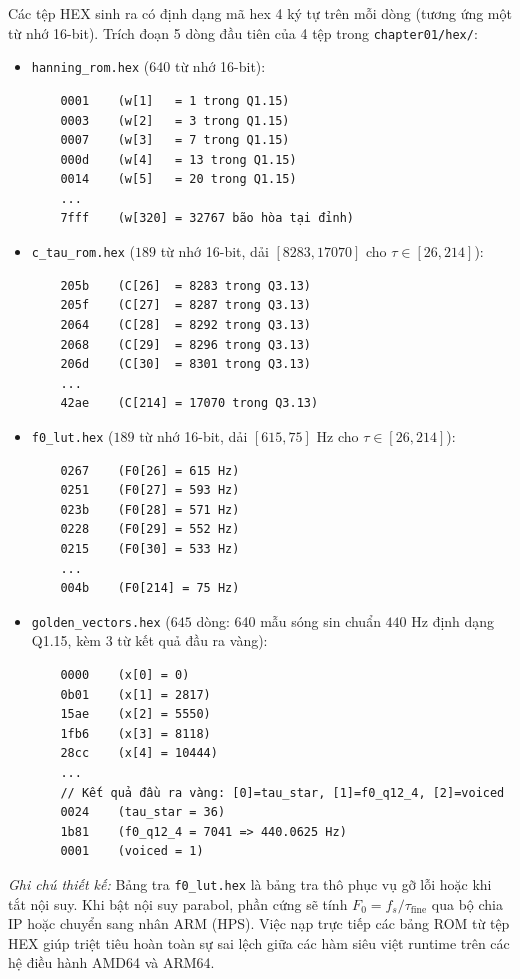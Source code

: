\documentclass[11pt,a4paper]{article}
\begin{document}
Các tệp HEX sinh ra có định dạng mã hex 4 ký tự trên mỗi dòng (tương ứng một từ nhớ 16-bit). Trích đoạn 5 dòng đầu tiên của 4 tệp trong \texttt{chapter01/hex/}:
\begin{itemize}
    \setlength{\itemsep}{1pt}
    \item \texttt{hanning\_rom.hex} ($640$ từ nhớ 16-bit):
    \begin{verbatim}
    0001    (w[1]   = 1 trong Q1.15)
    0003    (w[2]   = 3 trong Q1.15)
    0007    (w[3]   = 7 trong Q1.15)
    000d    (w[4]   = 13 trong Q1.15)
    0014    (w[5]   = 20 trong Q1.15)
    ...
    7fff    (w[320] = 32767 bão hòa tại đỉnh)
    \end{verbatim}
    \item \texttt{c\_tau\_rom.hex} ($189$ từ nhớ 16-bit, dải $[8283, 17070]$ cho $\tau \in [26, 214]$):
    \begin{verbatim}
    205b    (C[26]  = 8283 trong Q3.13)
    205f    (C[27]  = 8287 trong Q3.13)
    2064    (C[28]  = 8292 trong Q3.13)
    2068    (C[29]  = 8296 trong Q3.13)
    206d    (C[30]  = 8301 trong Q3.13)
    ...
    42ae    (C[214] = 17070 trong Q3.13)
    \end{verbatim}
    \item \texttt{f0\_lut.hex} ($189$ từ nhớ 16-bit, dải $[615, 75]\text{ Hz}$ cho $\tau \in [26, 214]$):
    \begin{verbatim}
    0267    (F0[26] = 615 Hz)
    0251    (F0[27] = 593 Hz)
    023b    (F0[28] = 571 Hz)
    0228    (F0[29] = 552 Hz)
    0215    (F0[30] = 533 Hz)
    ...
    004b    (F0[214] = 75 Hz)
    \end{verbatim}
    \item \texttt{golden\_vectors.hex} ($645$ dòng: 640 mẫu sóng sin chuẩn $440\text{ Hz}$ định dạng Q1.15, kèm 3 từ kết quả đầu ra vàng):
    \begin{verbatim}
    0000    (x[0] = 0)
    0b01    (x[1] = 2817)
    15ae    (x[2] = 5550)
    1fb6    (x[3] = 8118)
    28cc    (x[4] = 10444)
    ...
    // Kết quả đầu ra vàng: [0]=tau_star, [1]=f0_q12_4, [2]=voiced
    0024    (tau_star = 36)
    1b81    (f0_q12_4 = 7041 => 440.0625 Hz)
    0001    (voiced = 1)
    \end{verbatim}
\end{itemize}

\textit{Ghi chú thiết kế:} Bảng tra \texttt{f0\_lut.hex} là bảng tra thô phục vụ gỡ lỗi hoặc khi tắt nội suy. Khi bật nội suy parabol, phần cứng sẽ tính $F_0 = f_s / \tau_{\text{fine}}$ qua bộ chia IP hoặc chuyển sang nhân ARM (HPS). Việc nạp trực tiếp các bảng ROM từ tệp HEX giúp triệt tiêu hoàn toàn sự sai lệch giữa các hàm siêu việt runtime trên các hệ điều hành AMD64 và ARM64.
\end{document}
